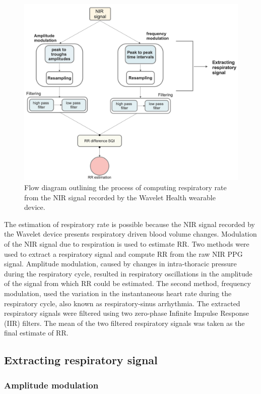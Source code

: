 \begin{figure}
    \centering
\includegraphics[width = 11 cm]{./figures/RRflowchart.png}
    \caption{Flow diagram outlining the process  of computing respiratory rate from the NIR signal recorded by the Wavelet Health wearable device.}
    \label{fig:ppg_rr_est_overview} 
\end{figure}

The estimation of respiratory rate is possible because the NIR signal recorded by the Wavelet device presents respiratory driven blood volume changes. Modulation of the NIR signal due to respiration is used to estimate RR. Two methods were used to extract a respiratory signal and compute RR from the raw NIR PPG signal. Amplitude modulation, caused by changes in intra-thoracic pressure during the respiratory cycle, resulted in respiratory oscillations in the amplitude of the signal from which RR could be estimated. The second method, frequency modulation, used the variation in the instantaneous heart rate during the respiratory cycle, also known as respiratory-sinus arrhythmia. The extracted respiratory signals were filtered using two zero-phase Infinite Impulse Response (IIR) filters. The mean of the two filtered respiratory signals was taken as the final estimate of RR.

\subsection{Extracting respiratory signal}

\subsubsection{Amplitude modulation}

